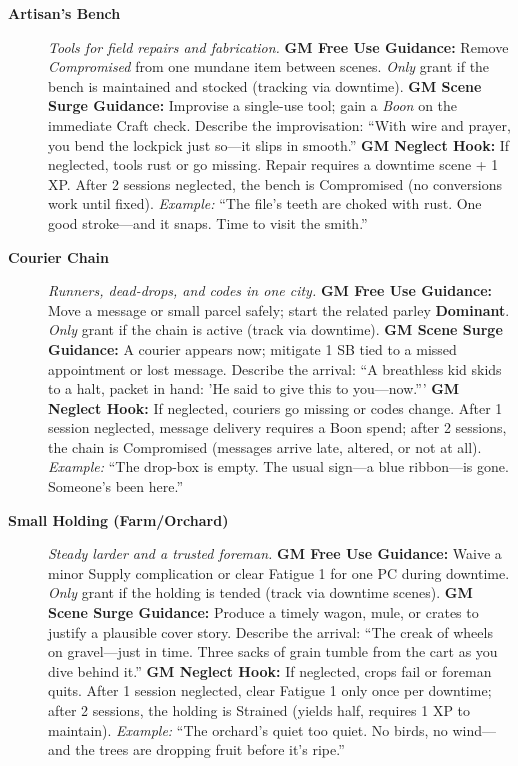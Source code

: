 \begin{description}
  \item[\textbf{Artisan's Bench}]   
        \emph{Tools for field repairs and fabrication.}  
        \textbf{GM Free Use Guidance:} Remove \emph{Compromised} from one mundane item between scenes. \emph{Only} grant if the bench is maintained and stocked (tracking via downtime).  
        \textbf{GM Scene Surge Guidance:} Improvise a single-use tool; gain a \emph{Boon} on the immediate Craft check. Describe the improvisation: ``With wire and prayer, you bend the lockpick just so---it slips in smooth.''  
        \textbf{GM Neglect Hook:} If neglected, tools rust or go missing. Repair requires a downtime scene + 1 XP. After 2 sessions neglected, the bench is Compromised (no conversions work until fixed).  
        \textit{Example:} ``The file's teeth are choked with rust. One good stroke---and it snaps. Time to visit the smith.''  

  \item[\textbf{Courier Chain}]   
        \emph{Runners, dead-drops, and codes in one city.}  
        \textbf{GM Free Use Guidance:} Move a message or small parcel safely; start the related parley \textbf{Dominant}. \emph{Only} grant if the chain is active (track via downtime).  
        \textbf{GM Scene Surge Guidance:} A courier appears now; mitigate 1 SB tied to a missed appointment or lost message. Describe the arrival: ``A breathless kid skids to a halt, packet in hand: 'He said to give this to you---now.'''  
        \textbf{GM Neglect Hook:} If neglected, couriers go missing or codes change. After 1 session neglected, message delivery requires a Boon spend; after 2 sessions, the chain is Compromised (messages arrive late, altered, or not at all).  
        \textit{Example:} ``The drop-box is empty. The usual sign---a blue ribbon---is gone. Someone's been here.''  

  \item[\textbf{Small Holding (Farm/Orchard)}]   
        \emph{Steady larder and a trusted foreman.}  
        \textbf{GM Free Use Guidance:} Waive a minor Supply complication or clear Fatigue 1 for one PC during downtime. \emph{Only} grant if the holding is tended (track via downtime scenes).  
        \textbf{GM Scene Surge Guidance:} Produce a timely wagon, mule, or crates to justify a plausible cover story. Describe the arrival: ``The creak of wheels on gravel---just in time. Three sacks of grain tumble from the cart as you dive behind it.''  
        \textbf{GM Neglect Hook:} If neglected, crops fail or foreman quits. After 1 session neglected, clear Fatigue 1 only once per downtime; after 2 sessions, the holding is Strained (yields half, requires 1 XP to maintain).  
        \textit{Example:} ``The orchard's quiet too quiet. No birds, no wind---and the trees are dropping fruit before it's ripe.''  


\end{description}
